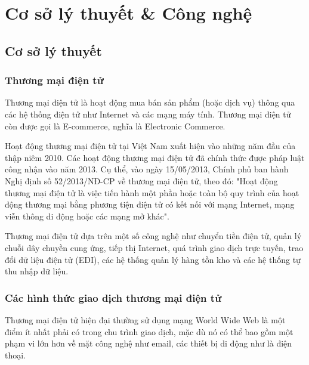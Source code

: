 \chapter{Cơ sở lý thuyết \& Công nghệ}
\section{Cơ sở lý thuyết}
\subsection{Thương mại điện tử}
\par \hspace{\parindent} Thương mại điện tử là hoạt động mua bán sản phẩm (hoặc dịch vụ) thông qua các hệ thống điện tử như Internet và các mạng máy tính. Thương mại điện tử còn được gọi là E-commerce, nghĩa là Electronic Commerce. \par

Hoạt động thương mại điện tử tại Việt Nam xuất hiện vào những năm đầu của thập niêm 2010. Các hoạt động thương mại điện tử đã chính thức được pháp luật công nhận vào năm 2013. Cụ thể, vào ngày 15/05/2013, Chính phủ ban hành Nghị định số 52/2013/NĐ-CP về thương mại điện tử, theo đó: "Hoạt động thương mại điện tử là việc tiến hành một phần hoặc toàn bộ quy trình của hoạt động thương mại bằng phương tiện điện tử có kết nối với mạng Internet, mạng viễn thông di động hoặc các mạng mở khác". \par

Thương mại điện tử dựa trên một số công nghệ như chuyển tiền điện tử, quản lý chuỗi dây chuyền cung ứng, tiếp thị Internet, quá trình giao dịch trực tuyến, trao đổi dữ liệu điện tử (EDI), các hệ thống quản lý hàng tồn kho và các hệ thống tự thu nhập dữ liệu. \par

\subsection{Các hình thức giao dịch thương mại điện tử}

Thương mại điện tử hiện đại thường sử dụng mạng World Wide Web là một điểm ít nhất phải có trong chu trình giao dịch, mặc dù nó có thể bao gồm một phạm vi lớn hơn về mặt công nghệ như email, các thiết bị di động như là điện thoại. \par

